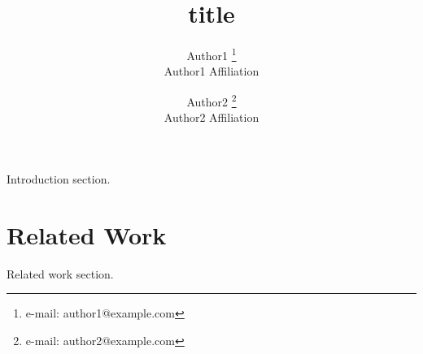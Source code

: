 \documentclass{vgtc}                          %
\title{title}
\author{Author1 \thanks{e-mail: author1@example.com}\\ \scriptsize Author1 Affiliation %
\and Author2 \thanks{e-mail: author2@example.com}\\ \scriptsize Author2 Affiliation}
\begin{document}
\maketitle

Introduction section.

\section{Related Work}

Related work section.




\end{document}
